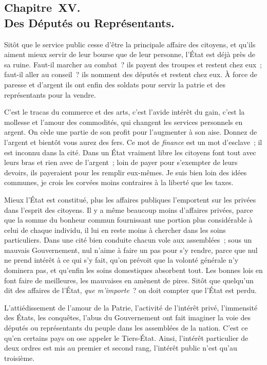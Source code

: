 \documentclass[french,twoside]{book} %
\begin{document}
\subsection[{Chapitre XV. Des Députés ou Représentants.}]{Chapitre XV. \\
Des Députés ou Représentants.}
\noindent Sitôt que le service public cesse d’être la principale affaire des citoyens, et qu’ils aiment mieux servir de leur bourse que de leur personne, l’État est déjà près de sa ruine. Faut-il marcher au combat ? ils payent des troupes et restent chez eux ; faut-il aller au conseil ? ils nomment des députés et restent chez eux. À force de paresse et d’argent ils ont enfin des soldats pour servir la patrie et des représentants pour la vendre.\par
C’est le tracas du commerce et des arts, c’est l’avide intérêt du gain, c’est la mollesse et l’amour des commodités, qui changent les services personnels en argent. On cède une partie de son profit pour l’augmenter à son aise. Donnez de l’argent et bientôt vous aurez des fers. Ce mot de {\itshape finance} est un mot d’esclave ; il est inconnu dans la cité. Dans un État vraiment libre les citoyens font tout avec leurs bras et rien avec de l’argent ; loin de payer pour s’exempter de leurs devoirs, ils payeraient pour les remplir eux-mêmes. Je suis bien loin des idées communes, je crois les corvées moins contraires à la liberté que les taxes.\par
Mieux l’État est constitué, plus les affaires publiques l’emportent sur les privées dans l’esprit des citoyens. Il y a même beaucoup moins d’affaires privées, parce que la somme du bonheur commun fournissant une portion plus considérable à celui de chaque individu, il lui en reste moins à chercher dans les soins particuliers. Dans une cité bien conduite chacun vole aux assemblées ; sous un mauvais Gouvernement, nul n’aime à faire un pas pour s’y rendre, parce que nul ne prend intérêt à ce qui s’y fait, qu’on prévoit que la volonté générale n’y dominera pas, et qu’enfin les soins domestiques absorbent tout. Les bonnes lois en font faire de meilleures, les mauvaises en amènent de pires. Sitôt que quelqu’un dit des affaires de l’État, {\itshape que m’importe} ? on doit compter que l’État est perdu.\par
L’attiédissement de l’amour de la Patrie, l’activité de l’intérêt privé, l’immensité des États, les conquêtes, l’abus du Gouvernement ont fait imaginer la voie des députés ou représentants du peuple dans les assemblées de la nation. C’est ce qu’en certains pays on ose appeler le Tiers-État. Ainsi, l’intérêt particulier de deux ordres est mis au premier et second rang, l’intérêt public n’est qu’au troisième.\par
\end{document}
